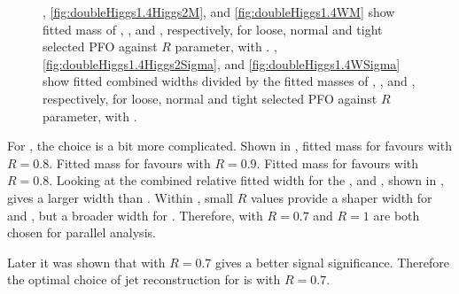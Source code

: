 \begin{figure}[!tbp]
\caption[Fitted mass, and resolution of \Hbb, \HWW and \PW for ]%
   {, \ref{fig:doubleHiggs1.4Higgs2M}, and \ref{fig:doubleHiggs1.4WM}  show fitted mass of \Hbb, \HWW, and \PW, respectively, for loose, normal and tight selected PFO against $R$ parameter, with . , \ref{fig:doubleHiggs1.4Higgs2Sigma}, and \ref{fig:doubleHiggs1.4WSigma} show fitted combined widths divided by the fitted masses of \Hbb, \HWW, and \PW, respectively, for loose, normal and tight selected PFO against $R$ parameter, with .}
   \label{fig:doubleHiggs1.4TeVMassFit}
\end{figure}


For , the choice is a bit more complicated. Shown in , fitted mass for \Hbb favours \normalPFO with $R = 0.8$. Fitted mass for \HWW favours \tightPFO with $R = 0.9$. Fitted mass for \PW favours \tightPFO with $R = 0.8$. Looking at the combined relative fitted width for the \Hbb, \HWW and \PW, shown in , \normalPFO gives a larger width than \tightPFO. Within \tightPFO, small $R$ values provide a shaper width for \HWW and \Hbb, but a broader width for \PW. Therefore, \tightPFO with $R = 0.7$ and $R = 1$ are both chosen for parallel analysis.

Later it was shown that \tightPFO with $R = 0.7$ gives a better signal significance. Therefore the optimal choice of jet reconstruction for  is \tightPFO with $R = 0.7$.

